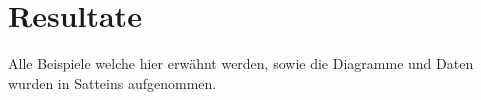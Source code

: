 \section{Resultate}
Alle Beispiele welche hier erwähnt werden, sowie die Diagramme und Daten wurden in Satteins aufgenommen.




\newpage